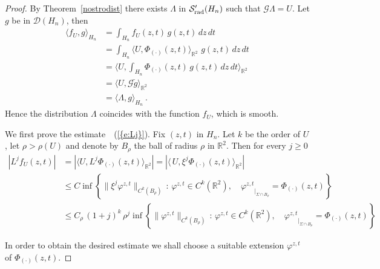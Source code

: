 \documentclass[12pt,a4paper]{amsart}
\theoremstyle{plain}
\theoremstyle{definition}
\numberwithin{equation}{section}
\begin{document}
\begin{proof}  By Theorem~\ref{nostrodist} there exists $\Lambda$ in ${{\mathcal S}'_{\text{\rm rad}}({{H_{n}}})}$ such that ${\mathcal G}  \Lambda = U $. 
Let $g$ be in ${\mathcal D}({{H_{n}}})$,  then 
$$
\begin{aligned}
\langle f_U,g\rangle_{H_n}&=
\int_{H_n}f_U(z,t)\,g(z,t)\,dz\,dt 
\\
&=\int_{H_n}{\langle {U},{\Phi_{(\cdot)}(z,t)} \rangle_{{\mathbb R}^2}}\,\,g(z,t)\,dz\,dt\\
&=\Big\langle U,\int_{H_n}\Phi_{(\cdot)}(z,t)\,g(z,t)\,dz\,dt\Big\rangle_{{\mathbb R}^2}\\
&={\langle {U},{{\mathcal G} \check g} \rangle_{{\mathbb R}^2}}\\
&=\langle \Lambda,g\rangle_{H_n}\ .
\end{aligned}
$$
Hence the distribution  $\Lambda$ coincides with the function $f_U$, which is smooth.

We first prove the estimate~{~(\ref{{e:Lj}})}.
Fix $(z,t)$ in ${{H_{n}}}$. 
Let $k$ be the order of $U$, let  $\rho>\rho(U)$ and   
denote by  $B_\rho$ the ball of radius $\rho$ in ${\mathbb R}^2$. Then for every $j\geq 0$
 \begin{align}
   \nonumber  \left|
     L^j f_U(z,t)
     \right|&=
     \left|{\langle { 
    U },{ {L}^j \Phi_{(\cdot)}(z,t)} \rangle_{{\mathbb R}^2}}
     \right|
     =
      \left|{\langle {\,U},{ \xi^j \Phi_{(\cdot)}(z,t)} \rangle_{{\mathbb R}^2}}
     \right|
     \\ \label{numero} &
           \leq
      C \inf{\left\{{ 
     \|
     \xi^j \varphi^{z,t}
      \|_{C^k(B_\rho)}\,:\,\varphi^{z,t}\in C^k({\mathbb R}^2),\quad
 {\varphi^{z,t}}_{|_{{\Sigma}\cap B_\rho}}=\Phi_{(\cdot)}(z,t)
}\right\}}
     \\ &
     \nonumber\leq
     C_{\rho}\, (1+j)^k\, \rho^j\inf{\left\{{ 
      \|\varphi^{z,t}
      \|_{C^k(B_\rho)}\,:\,\varphi^{z,t}\in C^k({\mathbb R}^2),\quad
 {\varphi^{z,t}}_{|_{{\Sigma}\cap B_\rho}}=\Phi_{(\cdot)}(z,t)
}\right\}}
\end{align}

In order to obtain the desired estimate we shall choose a suitable extension  $\varphi^{z,t}$ of $\Phi_{(\cdot)}(z,t)$.


\end{proof}
\end{document}

